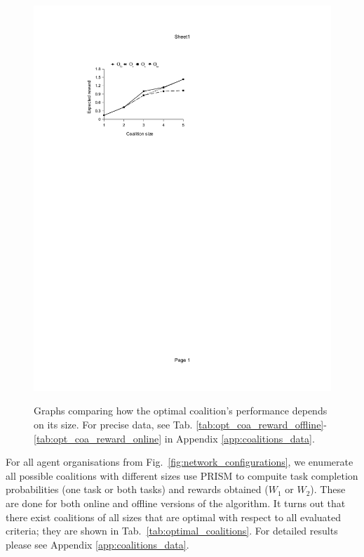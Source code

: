\documentclass{llncs}
\begin{document}
\begin{figure}[H]
{\includegraphics[clip=true, trim=101 520 280 115, scale=0.65]{images/w2_stpg_online}
}
\vspace{-8pt}
\caption{Graphs comparing how the optimal coalition's performance depends on its size. For precise data, see Tab. \ref{tab:opt_coa_reward_offline}-\ref{tab:opt_coa_reward_online} in Appendix \ref{app:coalitions_data}.}
\label{fig:coalition_performance}
\end{figure}


%
For all agent organisations from Fig.~\ref{fig:network_configurations}, we enumerate all possible coalitions with different sizes use PRISM to compuite task completion probabilities (one task or both tasks) and rewards obtained ($W_1$ or $W_2$). These are done for both online and offline versions of the algorithm. It turns out that there exist coalitions of all sizes that are optimal with respect to all evaluated criteria; they are shown in Tab.~\ref{tab:optimal_coalitions}.
For detailed results please see Appendix \ref{app:coalitions_data}.
\end{document}
